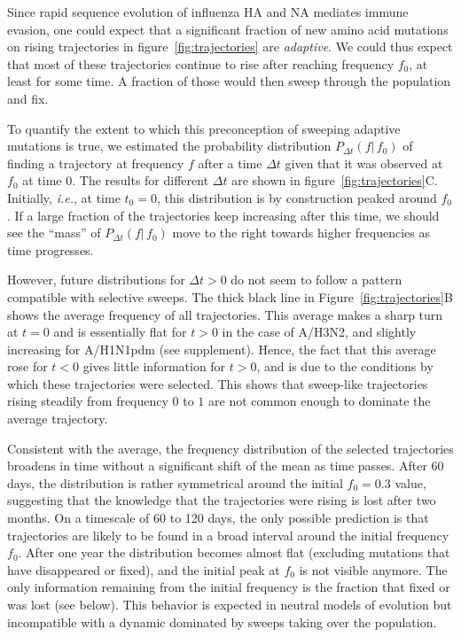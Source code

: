 \documentclass[reprint,amsmath,amssymb,superscriptaddress,showpacs,rmp]{revtex4-1}
\begin{document}
Since rapid sequence evolution of influenza HA and NA mediates immune evasion, one could expect that a significant fraction of new amino acid mutations on rising trajectories in figure~\ref{fig:trajectories} are \emph{adaptive}.
We could thus expect that most of these trajectories continue to rise after reaching frequency $f_0$, at least for some time.
A fraction of those would then sweep through the population and fix.

To quantify the extent to which this preconception of sweeping adaptive mutations is true, we estimated the probability distribution $P_{\Delta t}(f\vert\,f_0)$ of finding a trajectory at frequency $f$ after a time $\Delta t$ given that it was observed at $f_0$ at time $0$.
The results for different $\Delta t$ are shown in figure~\ref{fig:trajectories}C.
Initially, \emph{i.e.}, at time $t_0=0$, this distribution is by construction peaked around $f_0$.
If a large fraction of the trajectories keep increasing after  this time, we should see the ``mass'' of $P_{\Delta t}(f\vert\,f_0)$ move to the right towards higher frequencies as time progresses.

However, future distributions for $\Delta t >0$ do not seem to follow a pattern compatible with selective sweeps.
The thick black line in Figure~\ref{fig:trajectories}B shows the average frequency of all trajectories.
This average makes a sharp turn at $t=0$ and is essentially flat for $t>0$ in the case of A/H3N2, and slightly increasing for A/H1N1pdm (see supplement).
Hence, the fact that this average rose for $t<0$ gives little information for $t>0$, and is due to the conditions by which these trajectories were selected.
This shows that sweep-like trajectories rising steadily from frequency $0$ to $1$ are not common enough to dominate the average trajectory.

Consistent with the average, the frequency distribution of the selected trajectories broadens in time without a significant shift of the mean as time passes.
After 60 days, the distribution is rather symmetrical around the initial $f_0=0.3$ value, suggesting that the knowledge that the trajectories were rising is lost after two months.
On a timescale of 60 to 120 days, the only possible prediction is that trajectories are likely to be found in a broad interval around the initial frequency $f_0$.
After one year the distribution becomes almost flat (excluding mutations that have disappeared or fixed), and the initial peak at $f_0$ is not visible anymore.
The only information remaining from the initial frequency is the fraction that fixed or was lost (see below).
This behavior is expected in neutral models of evolution \citep{kimura_diffusion_1964} but incompatible with a dynamic dominated by sweeps taking over the population.
\end{document}
